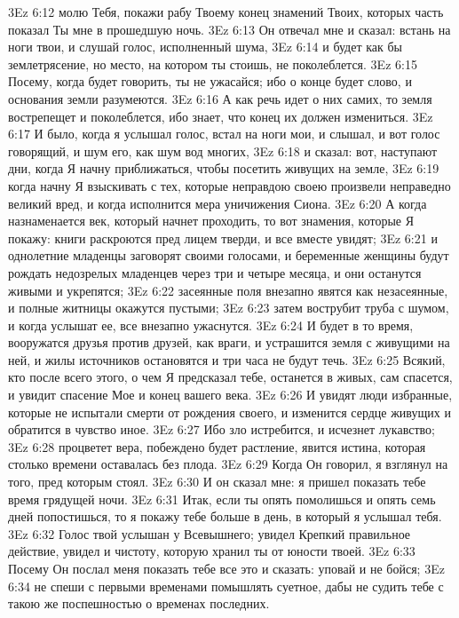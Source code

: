 \vs 3Ez 6:12 молю Тебя, покажи рабу Твоему конец знамений Твоих, которых часть показал Ты мне в прошедшую ночь.
\vs 3Ez 6:13 Он отвечал мне и сказал: встань на ноги твои, и слушай голос, исполненный шума,
\vs 3Ez 6:14 и будет как бы землетрясение, но место, на котором ты стоишь, не поколеблется.
\vs 3Ez 6:15 Посему, когда будет говорить, ты не ужасайся; ибо о конце будет слово, и основания земли разумеются.
\vs 3Ez 6:16 А как речь идет о них самих, то земля вострепещет и поколеблется, ибо знает, что конец их должен измениться.
\rsbpar\vs 3Ez 6:17 И было, когда я услышал голос, встал на ноги мои, и слышал, и вот голос говорящий, и шум его, как шум вод многих,
\vs 3Ez 6:18 и сказал: вот, наступают дни, когда Я начну приближаться, чтобы посетить живущих на земле,
\vs 3Ez 6:19 когда начну Я взыскивать с тех, которые неправдою своею произвели неправедно великий вред, и когда исполнится мера уничижения Сиона.
\vs 3Ez 6:20 А когда назнаменается век, который начнет проходить, то вот знамения, которые Я покажу: книги раскроются пред лицем тверди, и все вместе увидят;
\vs 3Ez 6:21 и однолетние младенцы заговорят своими голосами, и беременные женщины будут рождать недозрелых младенцев через три и четыре месяца, и они останутся живыми и укрепятся;
\vs 3Ez 6:22 засеянные поля внезапно явятся как незасеянные, и полные житницы окажутся пустыми;
\vs 3Ez 6:23 затем вострубит труба с шумом, и когда услышат ее, все внезапно ужаснутся.
\vs 3Ez 6:24 И будет в то время, вооружатся друзья против друзей, как враги, и устрашится земля с живущими на ней, и жилы источников остановятся и три часа не будут течь.
\vs 3Ez 6:25 Всякий, кто после всего этого, о чем Я предсказал тебе, останется в живых, сам спасется, и увидит спасение Мое и конец вашего века.
\vs 3Ez 6:26 И увидят люди избранные, которые не испытали смерти от рождения своего, и изменится сердце живущих и обратится в чувство иное.
\vs 3Ez 6:27 Ибо зло истребится, и исчезнет лукавство;
\vs 3Ez 6:28 процветет вера, побеждено будет растление, явится истина, которая столько времени оставалась без плода.
\vs 3Ez 6:29 Когда Он говорил, я взглянул на того, пред которым стоял.
\vs 3Ez 6:30 И он сказал мне: я пришел показать тебе время грядущей ночи.
\vs 3Ez 6:31 Итак, если ты опять помолишься и опять семь дней попостишься, то я покажу тебе больше в день, в который я услышал тебя.
\vs 3Ez 6:32 Голос твой услышан у Всевышнего; увидел Крепкий правильное действие, увидел и чистоту, которую хранил ты от юности твоей.
\vs 3Ez 6:33 Посему Он послал меня показать тебе все это и сказать: уповай и не бойся;
\vs 3Ez 6:34 не спеши с первыми временами помышлять суетное, дабы не судить тебе с такою же поспешностью о временах последних.
